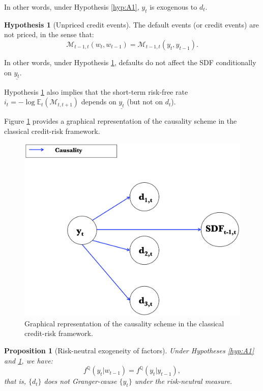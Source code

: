 \documentclass[
  12pt,
]{book}
\newtheorem{proposition}{Proposition}[chapter]
\theoremstyle{definition}
\theoremstyle{definition}
\theoremstyle{definition}
\theoremstyle{definition}
\newtheorem{hypothesis}{Hypothesis}[chapter]
\theoremstyle{remark}
\begin{document}
In other words, under Hypothesis \ref{hyp:A1}, \(y_t\) is exogenous to \(d_t\).

\begin{hypothesis}[Unpriced credit events]
\protect\hypertarget{hyp:A3}{}\label{hyp:A3}The default events (or credit events) are not priced, in the sense that:
\begin{equation*}
\mathcal{M}_{t-1, t}( w_t, w_{t-1}) = \mathcal{M}_{t-1, t}( y_t, y_{t-1}) .
\end{equation*}
\end{hypothesis}

In other words, under Hypothesis \ref{hyp:A3}, defaults do not affect the SDF conditionally on \(\underline{y_t}\).

Hypothesis \ref{hyp:A3} also implies that the short-term risk-free rate \(i_t=-\log\mathbb{E}_t(\mathcal{M}_{t,t+1})\) depends on \(\underline{y_t}\) (but not on \(d_t\)).

Figure \ref{fig:classical} provides a graphical representation of the causality scheme in the classical credit-risk framework.

\begin{figure}

{\centering \includegraphics[width=0.8\linewidth]{figures/Schema0} 

}

\caption{Graphical representation of the causality scheme in the classical credit-risk framework.}\label{fig:classical}
\end{figure}

\begin{proposition}[Risk-neutral exogeneity of factors]
\protect\hypertarget{prp:exogdunderQ}{}\label{prp:exogdunderQ}Under Hypotheses \ref{hyp:A1} and \ref{hyp:A3}, we have:
\[
f^{\mathbb{Q}}(y_t|w_{t-1}) = f^{\mathbb{Q}}(y_t|y_{t-1}),
\]
that is, \(\{d_t\}\) does not Granger-cause \(\{y_t\}\) under the risk-neutral measure.
\end{proposition}
\end{document}
